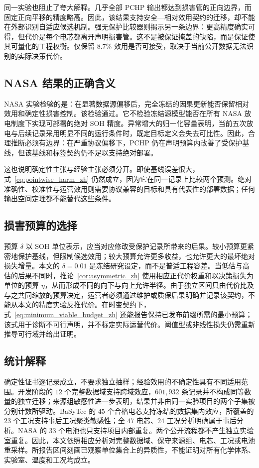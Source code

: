 \documentclass[UTF8,11pt]{ctexart}
\begin{document}
同一实验也阻止了夸大解释。几乎全部 PCHP 输出都达到损害管的正向边界，而固定正向平移的精度略高。因此，该结果支持安全—相对效用契约的迁移，却不能在外部识别自适应候选机制。强无保护比较器则揭示另一条边界：更高精度确实可得，但代价是每个电芯都离开声明损害管。这不是被保证掩盖的缺陷，而是保证使其可量化的工程权衡。仅保留 $8.7\%$ 效用是否可接受，取决于当前公开数据无法识别的实际决策代价。

\subsection{NASA 结果的正确含义}

NASA 实验检验的是：在显著数据源偏移后，完全冻结的因果更新能否保留相对效用和确定性损害控制。该检验通过。它不检验冻结源模型能否在所有 NASA 放电制度下实现可部署的绝对 SOH 精度。异常增大的归一化容量表明，当前五次放电与后续记录采用明显不同的运行条件时，既定目标定义会失去可比性。因此，合理推断必须有边界：在严重协议偏移下，PCHP 仍在声明预算内改善了受保护基线，但该基线和标签契约仍不足以支持绝对部署。

这也说明确定性主张与经验主张必须分开。即使基线误差很大，式~\eqref{eq:pointwise_harm_zh} 仍然成立，因为它在同一记录上比较两个预测。绝对准确性、校准性与运营效用则需要协议兼容的目标和具有代表性的部署数据；任何输出空间定理都不能替代这些条件。

\subsection{损害预算的选择}

预算 $\delta$ 以 SOH 单位表示，应当对应修改受保护记录所带来的后果。较小预算更紧密地保护基线，但限制候选效用；较大预算允许更多收益，也允许更大的最坏绝对损失增量。本文的 $\delta=0.01$ 是冻结研究设定，而不是普适工程容差。当低估与高估的后果不同时，推论~\ref{cor:asymmetric_zh} 使用相应正代价权重和以决策损失为单位的预算 $\eta$，从而形成不同的向下与向上允许半径。由于独立区间只由代价比及与之共同缩放的预算决定，运营者必须通过维护或质保后果明确并记录该契约，不能从本文的精度实验反推代价。在时变契约下，式~\eqref{eq:minimum_viable_budget_zh} 还能报告保持已发布前缀所需的最小预算；该式用于诊断不可行声明，并不标定实际运营代价。阈值型或非线性损失仍需重新推导可行域并给出证明。

\subsection{统计解释}

确定性证书逐记录成立，不要求独立抽样；经验效用的不确定性具有不同适用范围。开发阶段的 $12$ 个完整数据域支持跨域效应，$601{,}932$ 条记录并不构成同等数量的独立迁移；来源组敏感性进一步表明，结果并非由同一实验项目的两个子集被分别计数所驱动。BaSyTec 的 $45$ 个合格电芯支持冻结的数据集内效应，所覆盖的 $23$ 个工况支持事后工况聚类敏感性；全 $47$ 电芯、$24$ 工况分析明确属于事后分析。NASA 的 $33$ 个电池也只支持项目内部重复。两个公开流程都不产生独立实验室重复。因此，本文依照相应分析对完整数据域、保守来源组、电芯、工况或电池重采样。所报告区间刻画已观察单位集合上的异质性，不能证明对所有化学体系、实验室、温度和工况均成立。
\end{document}
